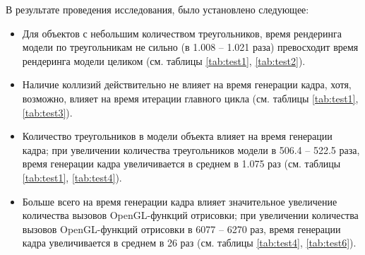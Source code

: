 В результате проведения исследования, было установлено следующее:
\begin{itemize}
    \item Для объектов с небольшим количеством треугольников, время рендеринга модели по треугольникам не сильно (в 1.008 -- 1.021 раза) превосходит время рендеринга модели целиком (см. таблицы \ref{tab:test1}, \ref{tab:test2}).
    \item Наличие коллизий действительно не влияет на время генерации кадра, хотя, возможно, влияет на время итерации главного цикла (см. таблицы \ref{tab:test1}, \ref{tab:test3}).
    \item Количество треугольников в модели объекта влияет на время генерации кадра; при увеличении количества треугольников модели в 506.4 -- 522.5 раза, время генерации кадра увеличивается в среднем в 1.075 раз (см. таблицы \ref{tab:test1}, \ref{tab:test4}).
    \item Больше всего на время генерации кадра влияет значительное увеличение количества вызовов OpenGL-функций отрисовки; при увеличении количества вызовов OpenGL-функций отрисовки в 6077 -- 6270 раз, время генерации кадра увеличивается в среднем в 26 раз (см. таблицы \ref{tab:test4}, \ref{tab:test6}).
\end{itemize}

